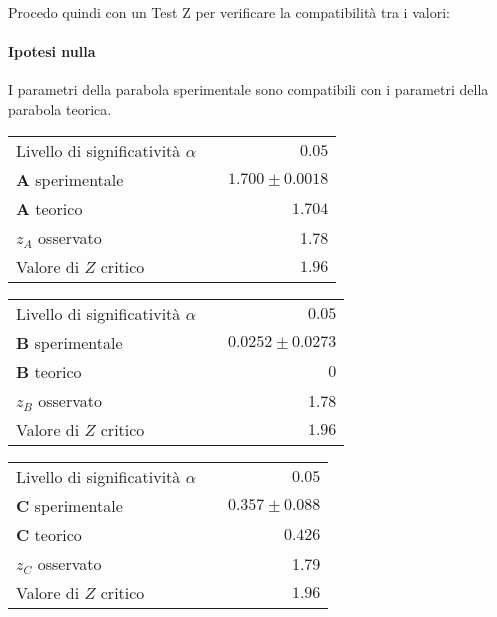 \documentclass{article}
\begin{document}
	\noindent
	Procedo quindi con un Test Z per verificare la compatibilità tra i valori:
	
	\paragraph{Ipotesi nulla} I parametri della parabola sperimentale sono compatibili con i parametri della parabola teorica.
	
	\vspace{0.7cm}
	\begin{minipage}{0.5\textwidth}
		\begin{table}[H]
			\centering
			\begin{tabular}{lr} 
				Livello di significatività $\alpha$		&$\quad 0.05$  \\
				\textbf{A} sperimentale				& $\quad1.700 \pm 0.0018 $\\
				\textbf{A} teorico					&  $\quad1.704$ \\
				$z_{A}$ osservato 					& $\quad$1.78 \\
				Valore di $Z$ critico     	& $\quad 1.96$
			\end{tabular}
		\end{table}
	\end{minipage}
	\begin{minipage}{0.5\textwidth}
		\begin{table}[H]
			\centering
			\begin{tabular}{lr} 
				Livello di significatività $\alpha$		&$\quad 0.05$  \\
				\textbf{B} sperimentale				& $\quad0.0252 \pm  0.0273$	\\
				\textbf{B} teorico					& $\quad 0$ \\
				$z_{B}$ osservato 					& $\quad$1.78 \\
				Valore di $Z$ critico     	& $\quad 1.96$
			\end{tabular}
		\end{table}
	\end{minipage}
	
	\begin{table}[H]
		\centering
		\begin{tabular}{lr} 
			Livello di significatività $\alpha$		&$\quad 0.05$  \\
			\textbf{C} sperimentale             	& $\quad0.357 \pm 0.088$     \\
			\textbf{C} teorico					&  $\quad 0.426 $\\
			$z_{C}$ osservato					& 1.79 \\ 
			Valore di $Z$ critico     	& $\quad 1.96$
		\end{tabular}
	\end{table}
	\vspace{0.7cm}
	
\end{document}
